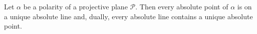 Let $\alpha$ be a polarity of a projective plane $\mathcal{P}$. Then every absolute point of $\alpha$ is on a unique absolute line and, dually, every absolute line contains a unique absolute point.
